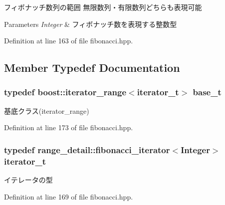 フィボナッチ数列の範囲 無限数列・有限数列どちらも表現可能 
\begin{DoxyParams}{\-Parameters}
{\em \-Integer} & フィボナッチ数を表現する整数型 \\
\hline
\end{DoxyParams}


\-Definition at line 163 of file fibonacci.\-hpp.



\subsection{\-Member \-Typedef \-Documentation}
\hypertarget{classyuh_1_1fibonacci__range_a9d51b0fc63206906184824c5b08403b2}{
\subsubsection[{base\-\_\-t}]{\setlength{\rightskip}{0pt plus 5cm}typedef boost\-::iterator\-\_\-range$<${\bf iterator\-\_\-t}$>$ {\bf base\-\_\-t}}}\label{db/de6/classyuh_1_1fibonacci__range_a9d51b0fc63206906184824c5b08403b2}
基底クラス(iterator\-\_\-range) 

\-Definition at line 173 of file fibonacci.\-hpp.

\hypertarget{classyuh_1_1fibonacci__range_a8d8b78b59079e797d7c2e623de6779b9}{
\subsubsection[{iterator\-\_\-t}]{\setlength{\rightskip}{0pt plus 5cm}typedef {\bf range\-\_\-detail\-::fibonacci\-\_\-iterator}$<$\-Integer$>$ {\bf iterator\-\_\-t}}}\label{db/de6/classyuh_1_1fibonacci__range_a8d8b78b59079e797d7c2e623de6779b9}
イテレータの型 

\-Definition at line 169 of file fibonacci.\-hpp.



